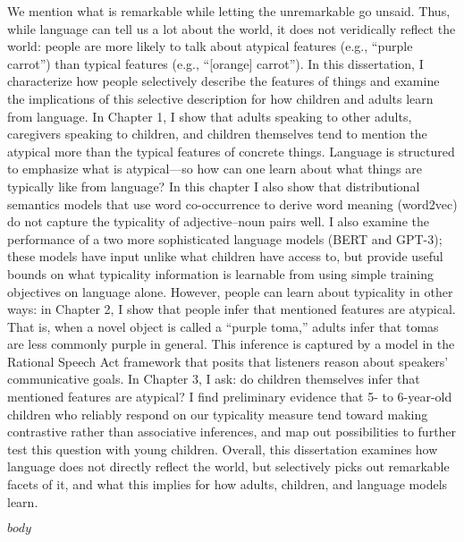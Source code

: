 \documentclass{ucetd}
\begin{document}
\abstract
We mention what is remarkable while letting the unremarkable go unsaid. Thus, while language can tell us a lot about the world, it does not veridically reflect the world: people are more likely to talk about atypical features (e.g., ``purple carrot'') than typical features (e.g., ``[orange] carrot''). In this dissertation, I characterize how people selectively describe the features of things and examine the implications of this selective description for how children and adults learn from language. In Chapter 1, I show that adults speaking to other adults, caregivers speaking to children, and children themselves tend to mention the atypical more than the typical features of concrete things. Language is structured to emphasize what is atypical—so how can one learn about what things are typically like from language? In this chapter I also show that distributional semantics models that use word co-occurrence to derive word meaning (word2vec) do not capture the typicality of adjective–noun pairs well. I also examine the performance of a two more sophisticated language models (BERT and GPT-3); these models have input unlike what children have access to, but provide useful bounds on what typicality information is learnable from using simple training objectives on language alone. However, people can learn about typicality in other ways: in Chapter 2, I show that people infer that mentioned features are atypical. That is, when a novel object is called a ``purple toma,'' adults infer that tomas are less commonly purple in general. This inference is captured by a model in the Rational Speech Act framework that posits that listeners reason about speakers' communicative goals. In Chapter 3, I ask: do children themselves infer that mentioned features are atypical? I find preliminary evidence that 5- to 6-year-old children who reliably respond on our typicality measure tend toward making contrastive rather than associative inferences, and map out possibilities to further test this question with young children. Overall, this dissertation examines how language does not directly reflect the world, but selectively picks out remarkable facets of it, and what this implies for how adults, children, and language models learn.

\mainmatter
$body$


\makebibliography

%
%
\end{document}
